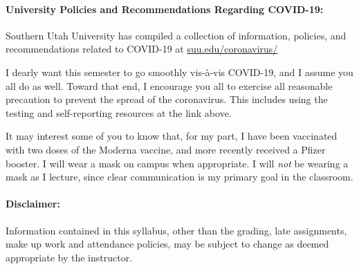 \documentclass[12pt, letterpaper]{article}
\begin{document}
\paragraph{University Policies and Recommendations Regarding COVID-19:}
Southern Utah University has compiled a collection of information, policies, and recommendations related to COVID-19 at \href{https://www.suu.edu/coronavirus/}{suu.edu/coronavirus/}

\noindent I dearly want this semester to go smoothly vis-\`a-vis COVID-19, and I assume you all do as well. Toward that end, I encourage you all to exercise all reasonable precaution to prevent the spread of the coronavirus. This includes using the testing and self-reporting resources at the link above.

\noindent It may interest some of you to know that, for my part, I have been vaccinated with two doses of the Moderna vaccine, and more recently received a Pfizer booster. I will wear a mask on campus when appropriate. I will \emph{not} be wearing a mask as I lecture, since clear communication is my primary goal in the classroom.

\paragraph{Disclaimer:}
Information contained in this syllabus, other than the grading, late assignments, make up work and attendance policies, may be subject to change as deemed appropriate by the instructor.
\end{document}
